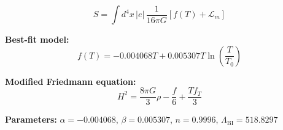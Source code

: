 
\begin{equation}
  S = \int d^4x \, |e| \, \frac{1}{16\pi G} \left[ f(T) + \mathcal{L}_m \right]
\end{equation}

\textbf{Best-fit model:}
\begin{equation}
  f(T) = -0.004068 T + 0.005307 T \ln\!\left(\frac{T}{T_0}\right)
\end{equation}

\textbf{Modified Friedmann equation:}
\begin{equation}
  H^2 = \frac{8\pi G}{3} \rho - \frac{f}{6} + \frac{T f_T}{3}
\end{equation}

\textbf{Parameters:}
$\alpha = -0.004068$, \quad
$\beta = 0.005307$, \quad
$n = 0.9996$, \quad
$\Lambda_{\text{BI}} = 518.8297$